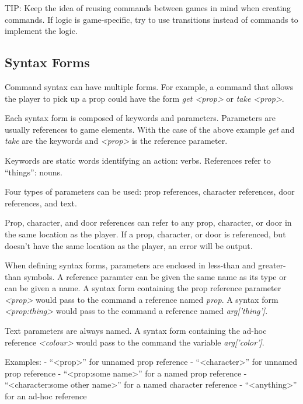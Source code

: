 \documentclass[letterpaper,10pt,english]{sphinxmanual}
\begin{document}
TIP: Keep the idea of reusing commands between games in mind when creating commands. If logic is game-specific, try to use transitions instead of commands to implement the logic.


\subsection{Syntax Forms}
\label{manipulation:syntax-forms}
Command syntax can have multiple forms. For example, a command that allows the player to pick up a prop could have the form \emph{get \textless{}prop\textgreater{}} or \emph{take \textless{}prop\textgreater{}}.

Each syntax form is composed of keywords and parameters. Parameters are usually references to game elements. With the case of the above example \emph{get} and \emph{take} are the keywords and \emph{\textless{}prop\textgreater{}} is the reference parameter.

Keywords are static words identifying an action: verbs. References refer to ``things'': nouns.

Four types of parameters can be used: prop references, character references, door references, and text.

Prop, character, and door references can refer to any prop, character, or door in the same location as the player. If a prop, character, or door is referenced, but doesn't have the same location as the player, an error will be output.

When defining syntax forms, parameters are enclosed in less-than and greater-than symbols. A reference paramter can be given the same name as its type or can be given a name. A syntax form containing the prop reference parameter \emph{\textless{}prop\textgreater{}} would pass to the command a reference named \emph{prop}. A syntax form \emph{\textless{}prop:thing\textgreater{}} would pass to the command a reference named \emph{arg{[}'thing'{]}}.

Text parameters are always named. A syntax form containing the ad-hoc reference \emph{\textless{}colour\textgreater{}} would pass to the command the variable \emph{arg{[}'color'{]}}.

Examples:
- ``\textless{}prop\textgreater{}'' for unnamed prop reference
- ``\textless{}character\textgreater{}'' for unnamed prop reference
- ``\textless{}prop:some name\textgreater{}'' for a named prop reference
- ``\textless{}character:some other name\textgreater{}'' for a named character reference
- ``\textless{}anything\textgreater{}'' for an ad-hoc reference
\end{document}
